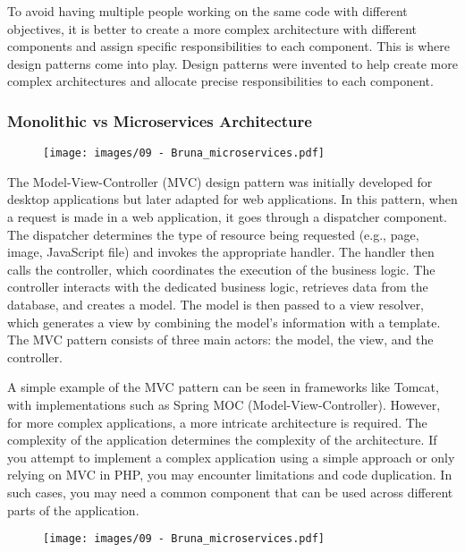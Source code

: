 To avoid having multiple people working on the same code with different
objectives, it is better to create a more complex architecture with
different components and assign specific responsibilities to each
component. This is where design patterns come into play. Design patterns
were invented to help create more complex architectures and allocate
precise responsibilities to each component.

\subsubsection{Monolithic vs Microservices Architecture}

\begin{figure}[!h]
  \centering
  \texttt{[image: images/09 - Bruna\_microservices.pdf]}
\end{figure}

The Model-View-Controller (MVC) design pattern was initially developed
for desktop applications but later adapted for web applications. In this
pattern, when a request is made in a web application, it goes through a
dispatcher component. The dispatcher determines the type of resource
being requested (e.g., page, image, JavaScript file) and invokes the
appropriate handler. The handler then calls the controller, which
coordinates the execution of the business logic. The controller
interacts with the dedicated business logic, retrieves data from the
database, and creates a model. The model is then passed to a view
resolver, which generates a view by combining the model's information
with a template. The MVC pattern consists of three main actors: the
model, the view, and the controller.

A simple example of the MVC pattern can be seen in frameworks like
Tomcat, with implementations such as Spring MOC (Model-View-Controller).
However, for more complex applications, a more intricate architecture is
required. The complexity of the application determines the complexity of
the architecture. If you attempt to implement a complex application
using a simple approach or only relying on MVC in PHP, you may encounter
limitations and code duplication. In such cases, you may need a common
component that can be used across different parts of the application.

\begin{figure}[!h]
  \centering
  \texttt{[image: images/09 - Bruna\_microservices.pdf]}
\end{figure}

